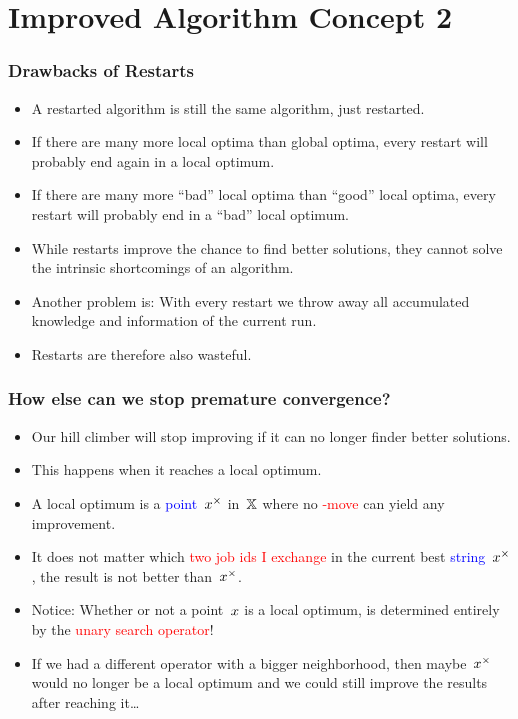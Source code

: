\documentclass[mathserif]{beamer}%
\begin{document}
\section{Improved Algorithm Concept 2}%
%
\begin{frame}%
\frametitle{Drawbacks of Restarts}%
\begin{itemize}%
\item A restarted algorithm is still the same algorithm, just restarted.%
\item<2-> If there are many more local optima than global optima, every restart will probably end again in a local optimum.%
\item<3-> If there are many more ``bad'' local optima than ``good'' local optima, every restart will probably end in a ``bad'' local optimum.%
\item<4-> While restarts improve the chance to find better solutions, they cannot solve the intrinsic shortcomings of an algorithm.\medskip%
\item<5-> Another problem is: With every restart we throw away all accumulated knowledge and information of the current run.%
\item<6-> Restarts are therefore also wasteful.%
\end{itemize}%
\end{frame}%
%
\begin{frame}%
\frametitle{How else can we stop premature convergence?}%
\begin{itemize}%
\item Our  hill climber will stop improving if it can no longer finder better solutions.%
\item<2-> This happens when it reaches a local optimum.%
\item<3-> A local optimum is a \textcolor<6>{blue}{point~$x^{\times}$} in~$\mathbb{X}$ where no \textcolor<5>{red}{-move} can yield any improvement.%
\item<4-> It does not matter which \textcolor<5>{red}{two job ids I exchange} in the current best \textcolor<6>{blue}{string~$x^{\times}$}, the result is not better than~\textcolor<6>{blue}{$x^{\times}$}.%
\item<5-> Notice: Whether or not a point~$x$ is a local optimum, is determined entirely by the \textcolor<5>{red}{unary search operator}!%
\item<6-> If we had a different operator with a bigger neighborhood, then maybe~\textcolor{blue}{$x^{\times}$} would no longer be a local optimum and we could still improve the results after reaching it\dots%
\end{itemize}%
\end{frame}%
\end{document}
